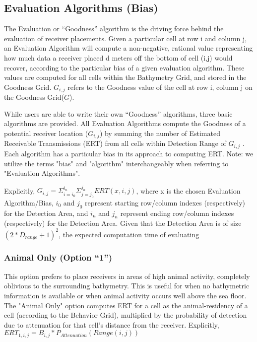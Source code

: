 \subsection{Evaluation Algorithms (Bias)}
The Evaluation or “Goodness” algorithm is the driving force behind the evaluation of receiver placements.  Given a particular cell at row i and column j, an Evaluation Algorithm will compute a non-negative, rational value representing how much data a receiver placed d meters off the bottom of cell (i,j) would recover, according to the particular bias of a given evaluation algorithm.  These values are computed for all cells within the Bathymetry Grid, and stored in the Goodness Grid.  $G_{i,j}$ refers to the Goodness value of the cell at row i, column j on the Goodness Grid($G$).  

While users are able to write their own “Goodness” algorithms, three basic algorithms are provided.  All Evaluation Algorithms compute the Goodness of a potential receiver location ($G_{i,j}$) by summing the number of Estimated Receivable Transmissions (ERT) from all cells within Detection Range of $G_{i,j}$ .  Each algorithm has a particular bias in its approach to computing ERT.  Note: we utilize the terms "bias" and "algorithm" interchangeably when referring to "Evaluation Algorithms".

Explicitly, $G_{i,j} = \Sigma_{i=i_0}^{i_n} \Sigma_{j=j_0}^{j_n} ERT(x,i,j)$, where x is the chosen Evaluation Algorithm/Bias, $i_0$ and $j_0$ represent starting row/column indexes (respectively) for the Detection Area, and $i_n$ and $j_n$ represent ending row/column indexes (respectively) for the Detection Area.  Given that the Detection Area is of size $(2*D_{range}+1)^2$, the expected computation time of evaluating

\subsubsection{Animal Only (Option “1”)}
\label{bias1}
This option prefers to place receivers in areas of high animal activity, completely oblivious to the surrounding bathymetry.  This is useful for when no bathymetric information is available or when animal activity occurs well above the sea floor.   The "Animal Only" option computes ERT for a cell as the animal-residency of a cell (according to the Behavior Grid), multiplied by the probability of detection due to attenuation for that cell's distance from the receiver.\newline
Explicitly,
$ERT_{1,i,j} = B_{i,j} * P_{Attenuation}(Range(i,j))$

